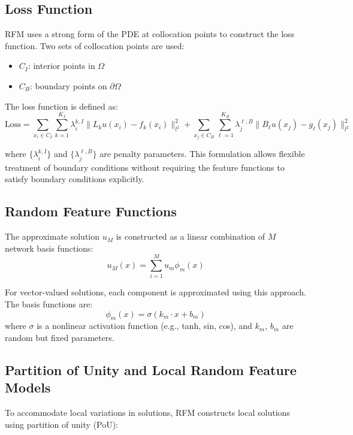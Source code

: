 \documentclass[11pt]{article}
\begin{document}
\subsection{Loss Function}
RFM uses a strong form of the PDE at collocation points to construct the loss function. Two sets of collocation points are used:
\begin{itemize}
    \item $C_I$: interior points in $\Omega$
    \item $C_B$: boundary points on $\partial\Omega$
\end{itemize}

The loss function is defined as:
\begin{equation}
\text{Loss} = \sum_{x_i \in C_I} \sum_{k=1}^{K_I} \lambda_i^{k,I} \|L_k u(x_i) - f_k(x_i)\|_{l^2}^2 + \sum_{x_j \in C_B} \sum_{\ell=1}^{K_B} \lambda_j^{\ell,B} \|B_\ell u(x_j) - g_\ell(x_j)\|_{l^2}^2
\end{equation}

where $\{\lambda_i^{k,I}\}$ and $\{\lambda_j^{\ell,B}\}$ are penalty parameters. This formulation allows flexible treatment of boundary conditions without requiring the feature functions to satisfy boundary conditions explicitly.

\subsection{Random Feature Functions}
The approximate solution $u_M$ is constructed as a linear combination of $M$ network basis functions:
\begin{equation}
u_M(x) = \sum_{i=1}^M u_m \phi_m(x)
\end{equation}

For vector-valued solutions, each component is approximated using this approach. The basis functions are:
\begin{equation}
\phi_m(x) = \sigma(k_m \cdot x + b_m)
\end{equation}
where $\sigma$ is a nonlinear activation function (e.g., tanh, sin, cos), and $k_m$, $b_m$ are random but fixed parameters.

\subsection{Partition of Unity and Local Random Feature Models}
To accommodate local variations in solutions, RFM constructs local solutions using partition of unity (PoU):
\end{document}
